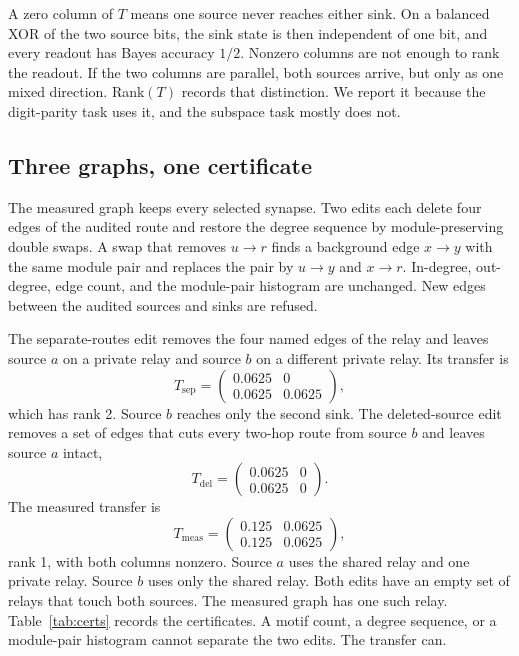 \documentclass[10pt,twocolumn,letterpaper]{article}
\begin{document}
A zero column of $T$ means one source never reaches either sink.
On a balanced XOR of the two source bits, the sink state is then independent of one bit, and every readout has Bayes accuracy $1/2$.
Nonzero columns are not enough to rank the readout.
If the two columns are parallel, both sources arrive, but only as one mixed direction.
Rank$(T)$ records that distinction.
We report it because the digit-parity task uses it, and the subspace task mostly does not.

\subsection{Three graphs, one certificate}
\label{sec:edits}

The measured graph keeps every selected synapse.
Two edits each delete four edges of the audited route and restore the degree sequence by module-preserving double swaps.
A swap that removes $u\!\to\!r$ finds a background edge $x\!\to\!y$ with the same module pair and replaces the pair by $u\!\to\!y$ and $x\!\to\!r$.
In-degree, out-degree, edge count, and the module-pair histogram are unchanged.
New edges between the audited sources and sinks are refused.

The separate-routes edit removes the four named edges of the relay and leaves source $a$ on a private relay and source $b$ on a different private relay.
Its transfer is
\[
T_{\mathrm{sep}}=\begin{pmatrix}0.0625&0\\0.0625&0.0625\end{pmatrix},
\]
which has rank 2.
Source $b$ reaches only the second sink.
The deleted-source edit removes a set of edges that cuts every two-hop route from source $b$ and leaves source $a$ intact,
\[
T_{\mathrm{del}}=\begin{pmatrix}0.0625&0\\0.0625&0\end{pmatrix}.
\]
The measured transfer is
\[
T_{\mathrm{meas}}=\begin{pmatrix}0.125&0.0625\\0.125&0.0625\end{pmatrix},
\]
rank 1, with both columns nonzero.
Source $a$ uses the shared relay and one private relay.
Source $b$ uses only the shared relay.
Both edits have an empty set of relays that touch both sources.
The measured graph has one such relay.
Table~\ref{tab:certs} records the certificates.
A motif count, a degree sequence, or a module-pair histogram cannot separate the two edits.
The transfer can.
\end{document}
